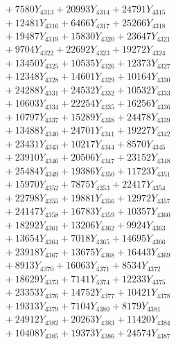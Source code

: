 \documentclass[a4paper,10pt]{article}
\begin{document}
{\begin{align}
&\;  + 7580 Y_{4313} + 20993 Y_{4314} + 24791 Y_{4315} \\[0.3ex]
&\;  + 12481 Y_{4316} + 6466 Y_{4317} + 25266 Y_{4318} \\[0.5ex]\allowbreak
&\;  + 19487 Y_{4319} + 15830 Y_{4320} + 23647 Y_{4321} \\[0.3ex]
&\;  + 9704 Y_{4322} + 22692 Y_{4323} + 19272 Y_{4324} \\[0.3ex]
&\;  + 13450 Y_{4325} + 10535 Y_{4326} + 12373 Y_{4327} \\[0.3ex]
&\;  + 12348 Y_{4328} + 14601 Y_{4329} + 10164 Y_{4330} \\[0.3ex]
&\;  + 24288 Y_{4331} + 24532 Y_{4332} + 10532 Y_{4333} \\[0.3ex]
&\;  + 10603 Y_{4334} + 22254 Y_{4335} + 16256 Y_{4336} \\[0.3ex]
&\;  + 10797 Y_{4337} + 15289 Y_{4338} + 24478 Y_{4339} \\[0.3ex]
&\;  + 13488 Y_{4340} + 24701 Y_{4341} + 19227 Y_{4342} \\[0.3ex]
&\;  + 23431 Y_{4343} + 10217 Y_{4344} + 8570 Y_{4345} \\[0.3ex]
&\;  + 23910 Y_{4346} + 20506 Y_{4347} + 23152 Y_{4348} \\[0.5ex]\allowbreak
&\;  + 25484 Y_{4349} + 19386 Y_{4350} + 11723 Y_{4351} \\[0.3ex]
&\;  + 15970 Y_{4352} + 7875 Y_{4353} + 22417 Y_{4354} \\[0.3ex]
&\;  + 22798 Y_{4355} + 19881 Y_{4356} + 12972 Y_{4357} \\[0.3ex]
&\;  + 24147 Y_{4358} + 16783 Y_{4359} + 10357 Y_{4360} \\[0.3ex]
&\;  + 18292 Y_{4361} + 13206 Y_{4362} + 9924 Y_{4363} \\[0.3ex]
&\;  + 13654 Y_{4364} + 7018 Y_{4365} + 14695 Y_{4366} \\[0.3ex]
&\;  + 23918 Y_{4367} + 13675 Y_{4368} + 16443 Y_{4369} \\[0.3ex]
&\;  + 8913 Y_{4370} + 16063 Y_{4371} + 8534 Y_{4372} \\[0.3ex]
&\;  + 18629 Y_{4373} + 7141 Y_{4374} + 12233 Y_{4375} \\[0.3ex]
&\;  + 23353 Y_{4376} + 14752 Y_{4377} + 10421 Y_{4378} \\[0.5ex]\allowbreak
&\;  + 19313 Y_{4379} + 7104 Y_{4380} + 8179 Y_{4381} \\[0.3ex]
&\;  + 24912 Y_{4382} + 20263 Y_{4383} + 11420 Y_{4384} \\[0.3ex]
&\;  + 10408 Y_{4385} + 19373 Y_{4386} + 24574 Y_{4387} \\[0.3ex]

\end{align}}
\end{document}
